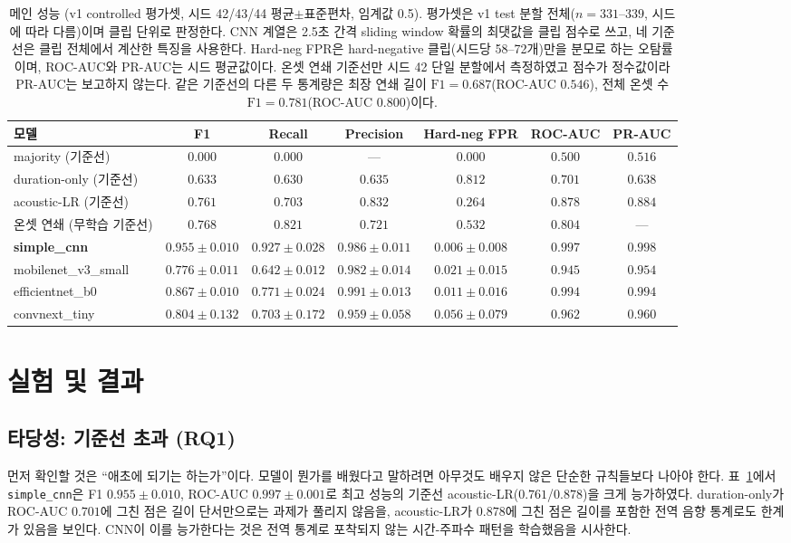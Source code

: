 \documentclass[10pt,twocolumn]{article}
\begin{document}
\begin{table}[!t]
\centering
\caption{메인 성능 (v1 controlled 평가셋, 시드 42/43/44 평균$\pm$표준편차, 임계값 0.5).
평가셋은 v1 test 분할 전체($n=331$--$339$, 시드에 따라 다름)이며 클립 단위로 판정한다. CNN
계열은 2.5초 간격 sliding window 확률의 최댓값을 클립 점수로 쓰고, 네 기준선은 클립 전체에서
계산한 특징을 사용한다. Hard-neg FPR은 hard-negative 클립(시드당 58--72개)만을 분모로 하는
오탐률이며, ROC-AUC와 PR-AUC는 시드 평균값이다. 온셋 연쇄 기준선만 시드 42 단일 분할에서
측정하였고 점수가 정수값이라 PR-AUC는 보고하지 않는다. 같은 기준선의 다른 두 통계량은 최장
연쇄 길이 $\text{F1}=0.687$(ROC-AUC $0.546$), 전체 온셋 수 $\text{F1}=0.781$(ROC-AUC
$0.800$)이다.}
\label{tab:main}
\small
\setlength{\tabcolsep}{6pt}
\begin{tabular}{lcccccc}
\toprule
모델 & F1 & Recall & Precision & Hard-neg FPR & ROC-AUC & PR-AUC \\
\midrule
majority (기준선)      & $0.000$ & $0.000$ & --- & $0.000$ & $0.500$ & $0.516$ \\
duration-only (기준선) & $0.633$ & $0.630$ & $0.635$ & $0.812$ & $0.701$ & $0.638$ \\
acoustic-LR (기준선)   & $0.761$ & $0.703$ & $0.832$ & $0.264$ & $0.878$ & $0.884$ \\
온셋 연쇄 (무학습 기준선) & $0.768$ & $0.821$ & $0.721$ & $0.532$ & $0.804$ & --- \\
\textbf{simple\_cnn}   & $\mathbf{0.955\pm0.010}$ & $\mathbf{0.927\pm0.028}$ & $0.986\pm0.011$ & $\mathbf{0.006\pm0.008}$ & $\mathbf{0.997}$ & $\mathbf{0.998}$ \\
mobilenet\_v3\_small   & $0.776\pm0.011$ & $0.642\pm0.012$ & $0.982\pm0.014$ & $0.021\pm0.015$ & $0.945$ & $0.954$ \\
efficientnet\_b0       & $0.867\pm0.010$ & $0.771\pm0.024$ & $0.991\pm0.013$ & $0.011\pm0.016$ & $0.994$ & $0.994$ \\
convnext\_tiny         & $0.804\pm0.132$ & $0.703\pm0.172$ & $0.959\pm0.058$ & $0.056\pm0.079$ & $0.962$ & $0.960$ \\
\bottomrule
\end{tabular}
\end{table}

\section{실험 및 결과}\label{sec:exp}

\subsection{타당성: 기준선 초과 (RQ1)}
먼저 확인할 것은 ``애초에 되기는 하는가''이다. 모델이 뭔가를 배웠다고 말하려면 아무것도 배우지
않은 단순한 규칙들보다 나아야 한다. 표~\ref{tab:main}에서 \texttt{simple\_cnn}은 F1 $0.955\pm0.010$, ROC-AUC
$0.997\pm0.001$로 최고 성능의 기준선 acoustic-LR($0.761$/$0.878$)을 크게 능가하였다. duration-only가 ROC-AUC $0.701$에 그친 점은 길이 단서만으로는 과제가 풀리지
않음을, acoustic-LR가 $0.878$에 그친 점은 길이를 포함한 전역 음향 통계로도 한계가 있음을
보인다. CNN이 이를 능가한다는 것은 전역 통계로 포착되지 않는 시간-주파수 패턴을 학습했음을
시사한다.
\end{document}
